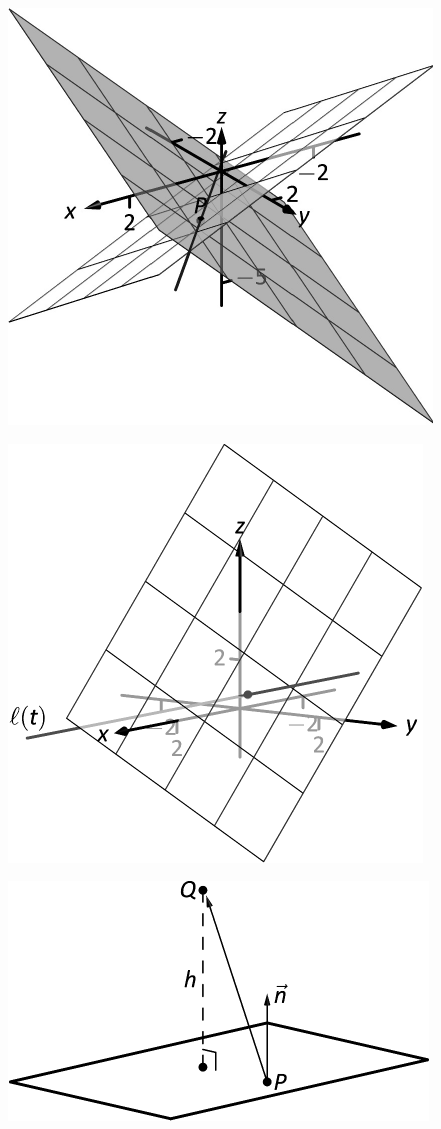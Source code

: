 \documentclass[10pt]{article}
\begin{document}
\includegraphics{figplanes4_3DBW.pdf}
\texttt{}

\includegraphics{figplanes5_3DBW.pdf}
\texttt{}

\includegraphics{figplanes_dist_3DBW.pdf}
\texttt{}
\end{document}
